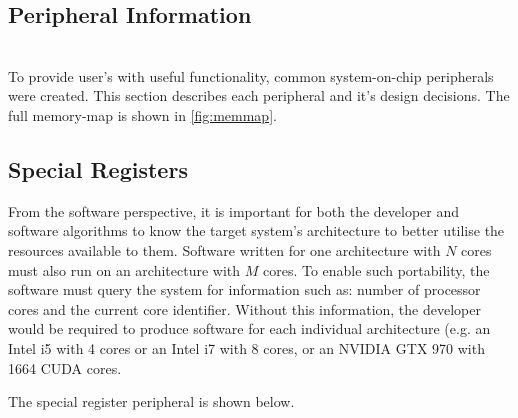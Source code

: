 \begin{appendices}
\startcontents[chapters]

\chapter{Peripheral Information}
\startcontents[chapters]
\noindent\\
To provide user's with useful functionality, common system-on-chip peripherals were created. This section describes each peripheral and it's design decisions. The full memory-map is shown in \cref{fig:memmap}.

\section{Special Registers}
From the software perspective, it is important for both the developer and software algorithms to know the target system's architecture to better utilise
the resources available to them.
Software written for one architecture with $N$ cores must also run on an architecture with $M$ cores. To enable such portability, the software must query the system for information such as: number of processor cores and the current core identifier. Without this information, the developer would be required to produce software for each individual architecture (e.g. an Intel i5 with 4 cores or an Intel i7 with 8 cores, or an NVIDIA GTX 970 with 1664 CUDA cores.

The special register peripheral is shown below.


\end{appendices}
